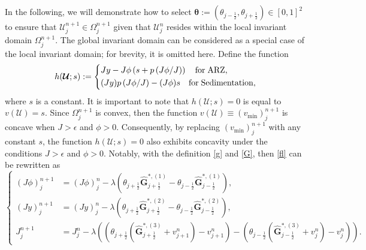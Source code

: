 \documentclass[times,final,11pt]{elsarticle}
\numberwithin{equation}{section}
\theoremstyle{definition}
\theoremstyle{remark}
\begin{document}
In the following, we will demonstrate how to select $\boldsymbol{\theta} := (\theta_{j - \frac12}, \theta_{j + \frac12}) \in [0, 1]^2$ to ensure that $\boldsymbol{\mathcal{U}}_j^{n + 1} \in \Omega_j^{n + 1}$ given that $\boldsymbol{\mathcal{U}}_j^{n}$ resides within the local invariant domain $\Omega_j^{n + 1}$. 
The global invariant domain can be considered as a special case of the local invariant domain; for brevity, it is omitted here.
Define the function 
\begin{equation*}
	 h (\boldsymbol{\mathcal{U}}; s) := \left\{
	 \begin{aligned}
	 	&Jy - J\phi \left(s + p \left(J\phi / J\right) \right) \quad {\rm for} \; {\rm ARZ},\\
	 	&(Jy) p \left(J\phi / J\right) - (J\phi) s \quad {\rm for} \; {\rm Sedimentation},
 	\end{aligned}
 	\right.
\end{equation*}
where $s$ is a constant. It is important to note that $h (\boldsymbol{\mathcal{U}}; s) = 0$ is equal to $v(\boldsymbol{\mathcal{U}}) = s$. Since $\Omega_j^{n + 1}$ is convex, then the function $v(\boldsymbol{\mathcal{U}}) \equiv (v_{\min})_j^{n + 1}$ is concave when $J > \epsilon$ and $\phi > 0$. Consequently, by replacing $(v_{\min})_j^{n + 1}$ with any constant $s$, the function $h (\boldsymbol{\mathcal{U}}; s) = 0$ also exhibits concavity under the conditions $J > \epsilon$ and $\phi > 0$.
Notably, with the definition \eqref{g} and \eqref{G}, then \eqref{fl} can be rewritten as
\begin{equation}
\label{124}
	\left\{
    \begin{aligned}
        (J \phi)_j^{n + 1} &= (J \phi)_j^{n} - \lambda \left(\theta_{j + \frac12} \widehat{\mathbf{G}}_{j + \frac{1}{2}}^{*,(1)} - \theta_{j - \frac12} \widehat{\mathbf{G}}_{j - \frac{1}{2}}^{*,(1)} \right), \\
        (J y)_j^{n + 1} &= (J y)_j^{n} - \lambda \left(\theta_{j + \frac12} \widehat{\mathbf{G}}_{j + \frac{1}{2}}^{*,(2)} - \theta_{j - \frac12} \widehat{\mathbf{G}}_{j - \frac{1}{2}}^{*,(2)} \right), \\
        J_j^{n + 1} &= J_j^n - \lambda \left( \left(\theta_{j + \frac12} \left( \widehat{\mathbf{G}}_{j + \frac{1}{2}}^{*,(3)} + v_{j + 1}^n \right) -  v_{j + 1}^n \right) - \left(\theta_{j - \frac12} \left(\widehat{\mathbf{G}}_{j - \frac{1}{2}}^{*,(3)} +  v_{j}^n \right) -  v_{j}^n \right)\right).
    \end{aligned}
    \right.
\end{equation}
\end{document}
